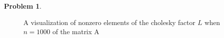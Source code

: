 \documentclass[10pt]{article}
\theoremstyle{definition}
\newtheorem{prob}{Problem}
\begin{document}
\begin{prob}
\begin{enumerate}[\bfseries(a)]
\begin{figure}
    \caption{A visualization of nonzero elements of the cholesky factor $L$ when $n=1000$ of the matrix A}
\end{figure}
\end{enumerate}
\end{prob}
\end{document}
